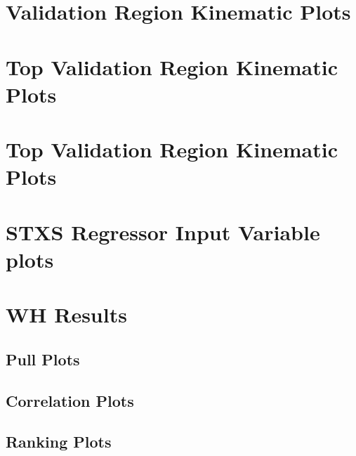 \documentclass{umassthesis}          %
\begin{document}
\chapter{\zdom{} Validation Region Kinematic Plots}\label{app:zdom_validation_plots}

\chapter{\zdom{} Top Validation Region Kinematic Plots}\label{app:zdom_top_validation_plots}

\chapter{\zdep{} Top Validation Region Kinematic Plots}\label{app:zdep_top_validation_plots}

% 

\chapter{STXS Regressor Input Variable plots}\label{app:stxs_input_plots}


\chapter{WH Results}\label{app:wh_results_appendix}
\section{Pull Plots}\label{app:wh_pull_plots}

\section{Correlation Plots}\label{app:wh_correlation_plots}

\section{Ranking Plots}\label{app:wh_ranking_plots}

% 
\end{document}
